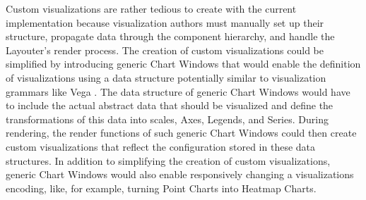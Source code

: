 Custom visualizations are rather tedious to create with the current implementation because visualization authors must manually set up their structure, propagate data through the component hierarchy, and handle the Layouter's render process.
The creation of custom visualizations could be simplified by introducing generic Chart Windows that would enable the definition of visualizations using a data structure potentially similar to visualization grammars like Vega \parencite{Vega}.
The data structure of generic Chart Windows would have to include the actual abstract data that should be visualized and define the transformations of this data into scales, Axes, Legends, and Series.
During rendering, the render functions of such generic Chart Windows could then create custom visualizations that reflect the configuration stored in these data structures.
In addition to simplifying the creation of custom visualizations, generic Chart Windows would also enable responsively changing a visualizations encoding, like, for example, turning Point Charts into Heatmap Charts.